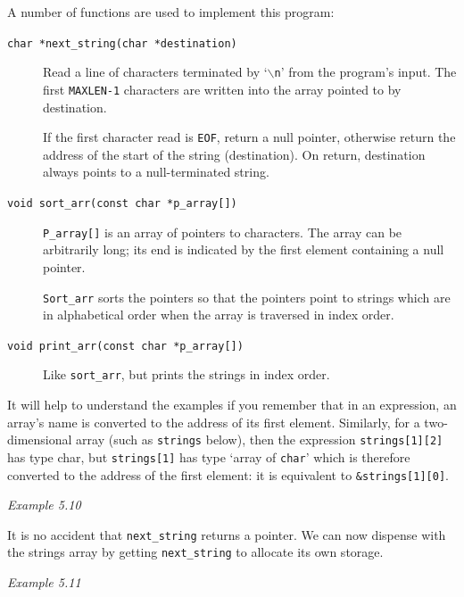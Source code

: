   A number of functions are used to implement this program:


  \begin{description}
   \item[\texttt{char *next\_string(char *destination)}] 
    Read a line of characters terminated by `\texttt{$\backslash$n}' from
     the program's input. The first \texttt{MAXLEN-1} characters are
     written into the array pointed to by destination.

    If the first character read is \texttt{EOF}, return a null pointer,
     otherwise return the address of the start of the string (destination).
     On return, destination always points to a null-terminated string.

   

   \item[\texttt{void sort\_arr(const char *p\_array[])}] 
    \texttt{P\_array[]} is an array of pointers to characters. The
     array can be arbitrarily long; its end is indicated by the first element
     containing a null pointer.

    \texttt{Sort\_arr} sorts the pointers so that the pointers point to
     strings which are in alphabetical order when the array is traversed in
     index order.

   

   \item[\texttt{void print\_arr(const char *p\_array[])}] Like \texttt{sort\_arr}, but prints the strings in index order.
  \end{description}

  It will help to understand the examples if you remember that in an
   expression, an array's name is converted to the address of its first
   element. Similarly, for a two-dimensional array (such as
   \texttt{strings} below), then the expression
   \texttt{strings[1][2]} has type char, but \texttt{strings[1]} has
   type `array of \texttt{char}' which is therefore converted to
   the address of the first element: it is equivalent to
   \texttt{\&strings[1][0]}.


  \begin{center}\textit{Example 5.10}\end{center}


  It is no accident that \texttt{next\_string} returns a pointer. We
   can now dispense with the strings array by getting
   \texttt{next\_string} to allocate its own storage.


  \begin{center}\textit{Example 5.11}\end{center}


